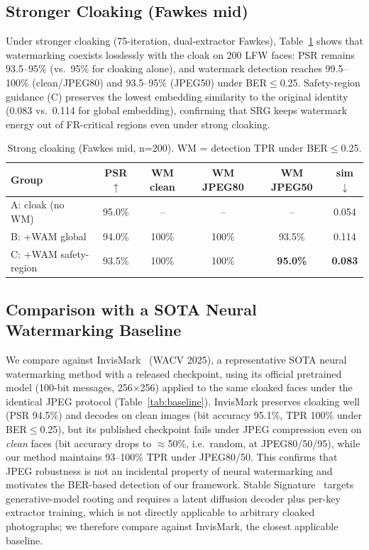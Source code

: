 \documentclass[preprint,12pt]{elsarticle}
\begin{document}
\subsection{Stronger Cloaking (Fawkes mid)}
Under stronger cloaking (75-iteration, dual-extractor Fawkes), Table~\ref{tab:mid} shows that watermarking coexists losslessly with the cloak on 200 LFW faces: PSR remains 93.5--95\% (vs.\ 95\% for cloaking alone), and watermark detection reaches 99.5--100\% (clean/JPEG80) and 93.5--95\% (JPEG50) under BER$\le$0.25. Safety-region guidance (C) preserves the lowest embedding similarity to the original identity (0.083 vs.\ 0.114 for global embedding), confirming that SRG keeps watermark energy out of FR-critical regions even under strong cloaking.

\begin{table}[t]
\caption{Strong cloaking (Fawkes mid, n=200). WM = detection TPR under BER$\le$0.25.}
\label{tab:mid}
\centering
\small
\begin{tabular}{lccccc}
\toprule
Group & PSR$\uparrow$ & WM clean & WM JPEG80 & WM JPEG50 & sim$\downarrow$ \\
\midrule
A: cloak (no WM)      & 95.0\% & -- & -- & -- & 0.054 \\
B: +WAM global        & 94.0\% & 100\% & 100\% & 93.5\% & 0.114 \\
C: +WAM safety-region & 93.5\% & 100\% & 100\% & \textbf{95.0\%} & \textbf{0.083} \\
\bottomrule
\end{tabular}
\end{table}

\subsection{Comparison with a SOTA Neural Watermarking Baseline}
\label{sec:baseline}
We compare against InvisMark~\cite{chen2025invis} (WACV 2025), a representative SOTA neural watermarking method with a released checkpoint, using its official pretrained model (100-bit messages, 256$\times$256) applied to the same cloaked faces under the identical JPEG protocol (Table~\ref{tab:baseline}). InvisMark preserves cloaking well (PSR 94.5\%) and decodes on clean images (bit accuracy 95.1\%, TPR 100\% under BER$\le$0.25), but its published checkpoint fails under JPEG compression even on \emph{clean} faces (bit accuracy drops to $\approx$50\%, i.e.\ random, at JPEG80/50/95), while our method maintains 93--100\% TPR under JPEG80/50. This confirms that JPEG robustness is not an incidental property of neural watermarking and motivates the BER-based detection of our framework. Stable Signature~\cite{fernandez2024stable} targets generative-model rooting and requires a latent diffusion decoder plus per-key extractor training, which is not directly applicable to arbitrary cloaked photographs; we therefore compare against InvisMark, the closest applicable baseline.
\end{document}
